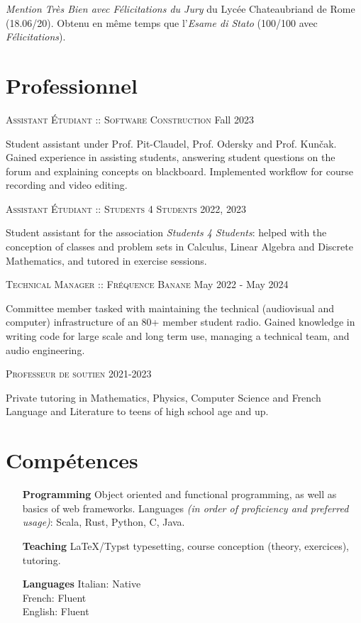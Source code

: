 \documentclass[11pt]{article}
\renewcommand{\line}[2]{{\vspace{4pt} \large \noindent\textsc{#1} \hfill #2}\vspace{4pt}}
\begin{document}
  \textit{Mention Très Bien avec Félicitations du Jury} du Lycée Chateaubriand de Rome (18.06/20). Obtenu en même temps que l'\textit{Esame di Stato} (100/100 avec \textit{Félicitations}).
  
  \section*{Professionnel}

  \line{Assistant Étudiant :: Software Construction}{Fall 2023}

  Student assistant under Prof. Pit-Claudel, Prof. Odersky and Prof. Kunčak. Gained experience in assisting students, answering student questions on the forum and explaining concepts on blackboard. Implemented workflow for course recording and video editing.

  \line{Assistant Étudiant :: Students 4 Students}{2022, 2023}

  Student assistant for the association \textit{Students 4 Students}: helped with the conception of classes and problem sets in Calculus, Linear Algebra and Discrete Mathematics, and tutored in exercise sessions.

  \line{Technical Manager :: Fréquence Banane}{May 2022 - May 2024}

  Committee member tasked with maintaining the technical (audiovisual and computer) infrastructure of an 80+ member student radio. Gained knowledge in writing code for large scale and long term use, managing a technical team, and audio engineering.

  \line{Professeur de soutien}{2021-2023}

  Private tutoring in Mathematics, Physics, Computer Science and French Language and Literature to teens of high school age and up.

  \section*{Compétences}
  
  \begin{adjustwidth}{1in}{}
    \begin{itemize}
      \item[\textbf{Programming}] Object oriented and functional programming, as well as basics of web frameworks. Languages \textit{(in order of proficiency and preferred usage)}: Scala, Rust, Python, C, Java. 
      \item[\textbf{Teaching}] LaTeX/Typst typesetting, course conception (theory, exercices), tutoring.
      \item[\textbf{Languages}] Italian: Native \\ French: Fluent \\ English: Fluent
    \end{itemize}
  \end{adjustwidth}
\end{document}
